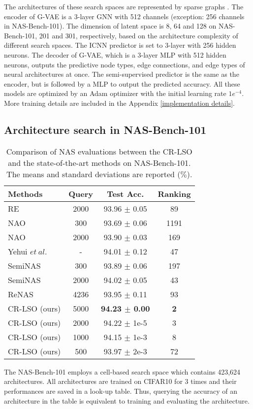 \documentclass[10pt,twocolumn,letterpaper]{article}
\begin{document}
The architectures of these search spaces are represented by sparse graphs \cite{fey2019fast}. The encoder of G-VAE is a 3-layer GNN with 512 channels (exception: 256 channels in NAS-Bench-101). The dimension of latent space is 8, 64 and 128 on NAS-Bench-101, 201 and 301, respectively, based on the architecture complexity of different search spaces. The ICNN predictor is set to 3-layer with 256 hidden neurons. The decoder of G-VAE, which is a 3-layer MLP with 512 hidden neurons, outputs the predictive node types, edge connections, and edge types of neural architectures at once. The semi-supervised predictor is the same as the encoder, but is followed by a MLP to output the predicted accuracy. All these models are optimized by an Adam optimizer with the initial learning rate $1e^{-4}$. More training details are included in the Appendix \ref{implementation details}. 
\subsection{Architecture search in NAS-Bench-101}
\begin{table}[htbp]
	\centering
	\caption{Comparison of NAS evaluations between the CR-LSO and the state-of-the-art methods on NAS-Bench-101. The means and standard deviations are reported ($\%$). }
	\begin{tabular}{lccc}
		\toprule
		Methods & Query & Test Acc. & Ranking \\
		\midrule
		RE \cite{real2019regularized} & 2000 & 93.96 $\pm$ 0.05 & 89 \\
		NAO \cite{luo2018neural} & 300 & 93.69 $\pm$ 0.06 & 1191 \\
		NAO \cite{luo2018neural} & 2000 & 93.90 $\pm$ 0.03 & 169 \\
		Yehui $et \ al.$ \cite{DBLP:conf/cvpr/TangWXCSXX0X20}  & - & 94.01 $\pm$ 0.12 & 47 \\
		SemiNAS \cite{DBLP:conf/nips/Luo0WQCL20} & 300 & 93.89 $\pm$ 0.06 & 197 \\
		SemiNAS \cite{DBLP:conf/nips/Luo0WQCL20} & 2000 & 94.02 $\pm$ 0.05 & 43 \\
		ReNAS \cite{DBLP:conf/cvpr/Xu00TJX021} & 4236 & 93.95 $\pm$ 0.11 & 93 \\ 
		\midrule
		CR-LSO (ours) & 5000 & \textbf{94.23 $\pm$ 0.00} & \textbf{2} \\ 
		CR-LSO (ours) & 2000 & 94.22 $\pm$ 1e-5 & 3 \\ 
		CR-LSO (ours) & 1000 & 94.15 $\pm$ 1e-3 & 8\\
		CR-LSO (ours) & 500 & 93.97 $\pm$ 2e-3 & 72 \\ 
		\bottomrule
	\end{tabular}
	\label{tab:nas_ben_101}
\end{table}
The NAS-Bench-101 employs a cell-based search space which contains 423,624 architectures. All architectures are trained on CIFAR10 for 3 times and their performances are saved in a look-up table. Thus, querying the accuracy of an architecture in the table is equivalent to training and evaluating the architecture. 
\end{document}
